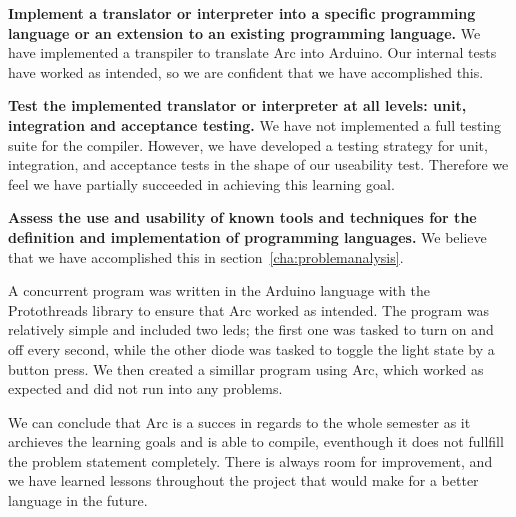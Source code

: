 \textbf{Implement a translator or interpreter into a specific programming language or an extension to an existing programming language.} We have implemented a transpiler to translate Arc into Arduino. Our internal tests have worked as intended, so we are confident that we have accomplished this.

\textbf{Test the implemented translator or interpreter at all levels: unit, integration and acceptance testing.} We have not implemented a full testing suite for the compiler. However, we have developed a testing strategy for unit, integration, and acceptance tests in the shape of our useability test. Therefore we feel we have partially succeeded in achieving this learning goal.

\textbf{Assess the use and usability of known tools and techniques for the definition and implementation of programming languages.} We believe that we have accomplished this in section~\ref{cha:problemanalysis}.

A concurrent program was written in the Arduino language with the Protothreads library to ensure that Arc worked as intended. The program was relatively simple and included two \gls{led}s; the first one was tasked to turn on and off every second, while the other diode was tasked to toggle the light state by a button press. We then created a simillar program using Arc, which worked as expected and did not run into any problems.

We can conclude that Arc is a succes in regards to the whole semester as it archieves the learning goals and is able to compile, eventhough it does not fullfill the problem statement completely. There is always room for improvement, and we have learned lessons throughout the project that would make for a better language in the future. 